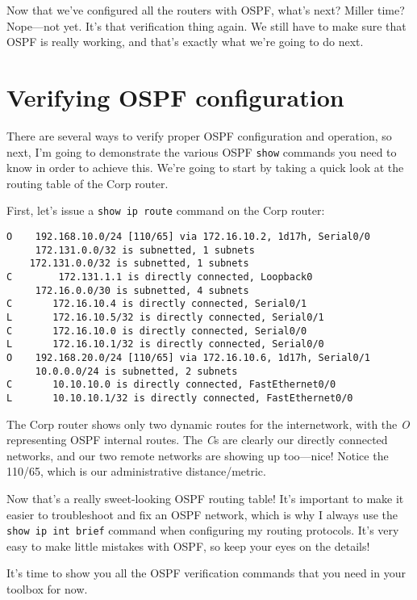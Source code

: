 Now that we've configured all the routers with OSPF, what's next? Miller
time? Nope---not yet. It's that verification thing again. We still have
to make sure that OSPF is really working, and that's exactly what we're
going to do next.




\section{Verifying OSPF configuration}

There are several ways to verify proper OSPF configuration and
operation, so next, I'm going to demonstrate the various OSPF
\texttt{show} commands you need to know in order to achieve this. We're
going to start by taking a quick look at the routing table of the Corp
router.

First, let's issue a \texttt{show\ ip\ route} command on the Corp
router:

\begin{verbatim}
O    192.168.10.0/24 [110/65] via 172.16.10.2, 1d17h, Serial0/0
     172.131.0.0/32 is subnetted, 1 subnets
    172.131.0.0/32 is subnetted, 1 subnets
C        172.131.1.1 is directly connected, Loopback0
     172.16.0.0/30 is subnetted, 4 subnets
C       172.16.10.4 is directly connected, Serial0/1
L       172.16.10.5/32 is directly connected, Serial0/1
C       172.16.10.0 is directly connected, Serial0/0
L       172.16.10.1/32 is directly connected, Serial0/0
O    192.168.20.0/24 [110/65] via 172.16.10.6, 1d17h, Serial0/1
     10.0.0.0/24 is subnetted, 2 subnets
C       10.10.10.0 is directly connected, FastEthernet0/0
L       10.10.10.1/32 is directly connected, FastEthernet0/0
\end{verbatim}

\protect\hypertarget{c18.xhtmlux5cux23Page_766}{}{}The Corp router shows
only two dynamic routes for the internetwork, with the \emph{O}
representing OSPF internal routes. The \emph{C}s are clearly our
directly connected networks, and our two remote networks are showing up
too---nice! Notice the 110/65, which is our administrative
distance/metric.

Now that's a really sweet-looking OSPF routing table! It's important to
make it easier to troubleshoot and fix an OSPF network, which is why I
always use the \texttt{show\ ip\ int\ brief} command when configuring my
routing protocols. It's very easy to make little mistakes with OSPF, so
keep your eyes on the details!

It's time to show you all the OSPF verification commands that you need
in your toolbox for now.

